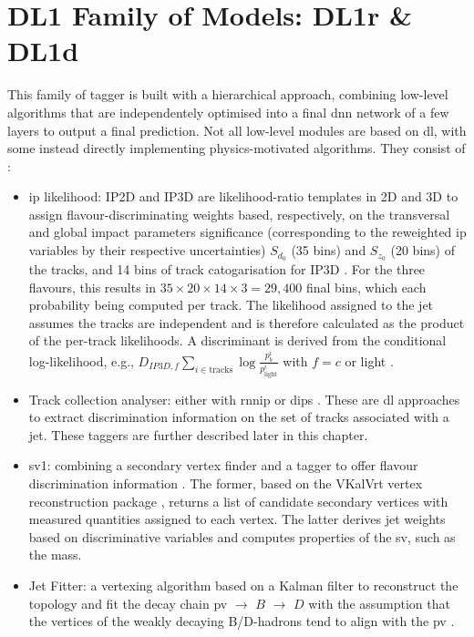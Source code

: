 \section{DL1 Family of Models: DL1r \& DL1d}
This family of tagger is built with a hierarchical approach, combining low-level algorithms that are independentely optimised into a final \gls{dnn} network of a few layers to output a final prediction. Not all low-level modules are based on \gls{dl}, with some instead directly implementing physics-motivated algorithms. They consist of \cite{Paganini:2289214, atlas:FTAGRUN2}:
\begin{itemize}
  \item \gls{ip} likelihood: IP2D and IP3D are likelihood-ratio templates in 2D and 3D to assign flavour-discriminating weights based, respectively, on the transversal and global impact parameters significance (corresponding to the reweighted \gls{ip} variables by their respective uncertainties) $S_{d_0}$ (35 bins) and $S_{z_0}$ (20 bins) of the tracks, and 14 bins of track catogarisation for IP3D \cite{ATLAS:2017bcq}. For the three flavours, this results in $35 \times 20 \times 14 \times 3 = 29,400$ final bins, which each probability being computed per track. The likelihood assigned to the jet assumes the tracks are independent and is therefore calculated as the product of the per-track likelihoods. A discriminant is derived from the conditional log-likelihood, e.g., $D_{IP3D,f}\sum_{i \in \textrm{tracks}} \log\frac{p_b^i}{p_{\textrm{light}}^i}$ with $f= c$ or light \cite{ATL-PHYS-PUB-2015-022}.
  \item Track collection analyser: either with \gls{rnnip} \cite{ATL-PHYS-PUB-2017-003} or \gls{dips} \cite{ATL-PHYS-PUB-2020-014}. These are \gls{dl} approaches to extract discrimination information on the set of tracks associated with a jet. These taggers are further described later in this chapter.  
  \item \gls{sv1}: combining a secondary vertex finder and a tagger to offer flavour discrimination information \cite{atlas:FTAGRUN2}. The former, based on the VKalVrt vertex reconstruction package \cite{Kostyukhin:685551}, returns a list of candidate secondary vertices with measured quantities assigned to each vertex. The latter derives jet weights based on discriminative variables and computes properties of the \gls{sv}, such as the mass. 
  \item Jet Fitter: a vertexing algorithm based on a Kalman filter to reconstruct the topology and fit the decay chain \gls{pv} $\rightarrow$ $B$ $\rightarrow$ $D$ with the assumption that the vertices of the weakly decaying B/D-hadrons tend to align with the \gls{pv} \cite{atlas:FTAGRUN2, ATL-PHYS-PUB-2018-025}. 
\end{itemize}

